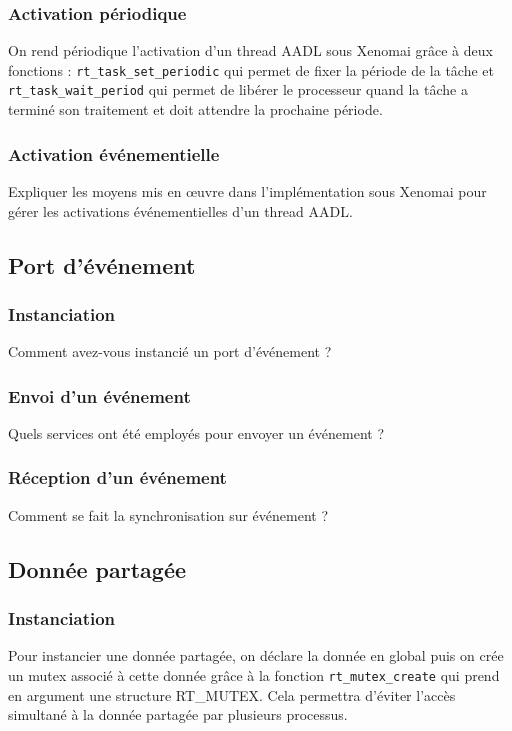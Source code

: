 \documentclass[11pt, a4paper]{paper}
\begin{document}
\subsubsection{Activation périodique}
 {\color{black} On rend périodique l'activation d'un thread AADL sous Xenomai grâce à deux fonctions : {\tt rt\_task\_set\_periodic} qui permet de fixer la période de la tâche et {\tt rt\_task\_wait\_period} qui permet de libérer le processeur quand la tâche a terminé son traitement et doit attendre la prochaine période.}

\subsubsection{Activation événementielle}
 {\color{blue} Expliquer les moyens mis en {\oe}uvre dans l'implémentation sous Xenomai pour gérer les activations événementielles d'un thread AADL.}

\subsection{Port d’événement}

\subsubsection{Instanciation}
 {\color{blue} Comment avez-vous instancié un port d'événement ?}

\subsubsection{Envoi d’un événement}
 {\color{blue} Quels services ont été employés pour envoyer un événement ?}

\subsubsection{Réception d’un événement}
 {\color{blue} Comment se fait la synchronisation sur événement ?}

\subsection{Donnée partagée}

\subsubsection{Instanciation}
 {\color{black} Pour instancier une donnée partagée, on déclare la donnée en global puis on crée un mutex associé à cette donnée grâce à la fonction {\tt rt\_mutex\_create} qui prend en argument une structure RT\_MUTEX. Cela permettra d'éviter l'accès simultané à la donnée partagée par plusieurs processus.}
\end{document}
